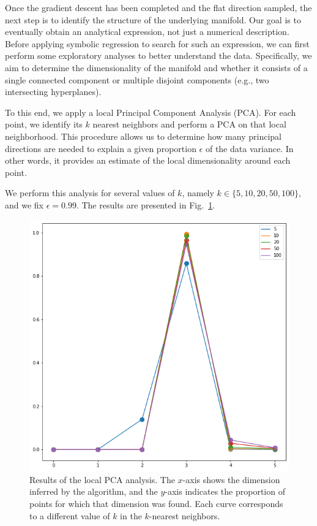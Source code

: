 \documentclass[11pt]{article}
\begin{document}
		Once the gradient descent has been completed and the flat direction sampled, the next step is to identify the structure of the underlying manifold. Our goal is to eventually obtain an analytical expression, not just a numerical description. Before applying symbolic regression to search for such an expression, we can first perform some exploratory analyses to better understand the data. Specifically, we aim to determine the dimensionality of the manifold and whether it consists of a single connected component or multiple disjoint components (e.g., two intersecting hyperplanes).
		
		To this end, we apply a local Principal Component Analysis (PCA). For each point, we identify its $k$ nearest neighbors and perform a PCA on that local neighborhood. This procedure allows us to determine how many principal directions are needed to explain a given proportion $\epsilon$ of the data variance. In other words, it provides an estimate of the local dimensionality around each point.
		
		We perform this analysis for several values of $k$, namely $k \in \{5, 10, 20, 50, 100\}$, and we fix $\epsilon = 0.99$. The results are presented in Fig. \ref{local_pca}.
		
		\begin{figure}
			\centering
			\includegraphics[scale=0.5]{Figures/Local_PCA.png}
			\caption{Results of the local PCA analysis. The $x$-axis shows the dimension inferred by the algorithm, and the $y$-axis indicates the proportion of points for which that dimension was found. Each curve corresponds to a different value of $k$ in the $k$-nearest neighbors.}
			\label{local_pca}
		\end{figure}
		
\end{document}
